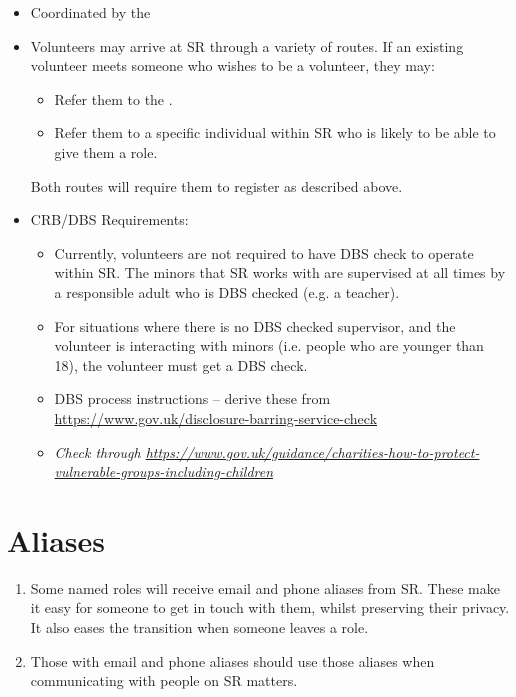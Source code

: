 \begin{itemize}
\item Coordinated by the 
\item Volunteers may arrive at SR through a variety of routes.  If an existing volunteer meets someone who wishes to be a volunteer, they may:
  \begin{itemize}
  \item Refer them to the .
  \item Refer them to a specific individual within SR who is likely to be able to give them a role.
  \end{itemize}
Both routes will require them to register as described above.
  
\item CRB/DBS Requirements:
  \begin{itemize}
  \item Currently, volunteers are not required to have  DBS check to operate within SR.  The minors that SR works with are supervised at all times by a responsible adult who is DBS checked (e.g. a teacher).
  \item For situations where there is no DBS checked supervisor, and the volunteer is interacting with minors (i.e. people who are younger than 18), the volunteer must get a DBS check.
  \item DBS process instructions -- derive these from \url{https://www.gov.uk/disclosure-barring-service-check}
  \item \textit{Check through \url{https://www.gov.uk/guidance/charities-how-to-protect-vulnerable-groups-including-children}}
  \end{itemize}
\end{itemize}

\section{Aliases}

\begin{enumerate}
\item Some named roles will receive email and phone aliases from SR.  These make it easy for someone to get in touch with them, whilst preserving their privacy.  It also eases the transition when someone leaves a role.

\item Those with email and phone aliases should use those aliases when communicating with people on SR matters.

\end{enumerate}
